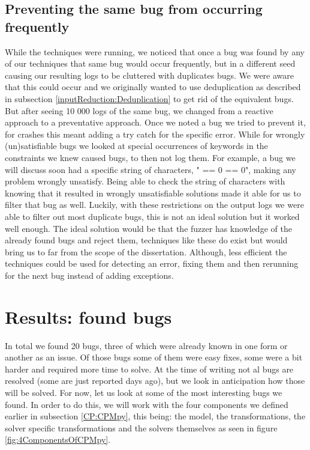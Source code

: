 \subsection{Preventing the same bug from occurring frequently}
While the techniques were running, we noticed that once a bug was found by any of our techniques that same bug would occur frequently, but in a different seed causing our resulting logs to be cluttered with duplicates bugs. We were aware that this could occur and we originally wanted to use deduplication as described in subsection \ref{inputReduction:Deduplication} to get rid of the equivalent bugs. But after seeing 10 000 logs of the same bug, we changed from a reactive approach to a preventative approach. Once we noted a bug we tried to prevent it, for crashes this meant adding a try catch for the specific error. While for wrongly (un)satisfiable bugs we looked at special occurrences of keywords in the constraints we knew caused bugs, to then not log them. For example, a bug we will discuss soon had a specific string of characters, " == 0 == 0", making any problem wrongly unsatisfy. Being able to check the string of characters with knowing that it resulted in wrongly unsatisfiable solutions made it able for us to filter that bug as well. Luckily, with these restrictions on the output logs we were able to filter out most duplicate bugs, this is not an ideal solution but it worked well enough. The ideal solution would be that the fuzzer has knowledge of the already found bugs and reject them, techniques like these do exist but would bring us to far from the scope of the dissertation. Although, less efficient the techniques could be used for detecting an error, fixing them and then rerunning for the next bug instead of adding exceptions.

\section{Results: found bugs}
\label{res:bugs}
In total we found 20 bugs, three of which were already known in one form or another as an issue. Of those bugs some of them were easy fixes, some were a bit harder and required more time to solve. At the time of writing not al bugs are resolved (some are just reported days ago), but we look in anticipation how those will be solved. For now, let us look at some of the most interesting bugs we found. In order to do this, we will work with the four components we defined earlier in subsection \ref{CP:CPMpy}, this being: the model, the transformations, the solver specific transformations and the solvers themselves as seen in figure \ref{fig:4ComponentsOfCPMpy}.


